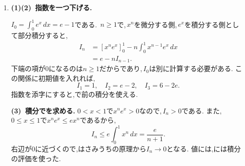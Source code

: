 \begin{enumerate}[label=\textbf{問\arabic*.},leftmargin=3.8em,format=\bookitemlink{practice-bridge}{solution}{problem}]
                \smallskip
                \textbf{(2)~重み付きの和と差.}
                $\sqrt3$の重みを付けた和と差の次項を作ると,
                \begin{align*}
                  z_{n+1}
                    &=(2x_n+3y_n)+\sqrt3(x_n+2y_n)\\
                    &=(2+\sqrt3)z_n.
                \end{align*}
                同様に$\displaystyle w_{n+1}=(2-\sqrt3)w_n$である.\,
                $\displaystyle z_0=w_0=1$から二つのを求め,
                \[
                  x_n=\frac{z_n+w_n}{2},\qquad
                  y_n=\frac{z_n-w_n}{2\sqrt3}
                \]
                と戻せばよい.重みは,展開後に元の$\displaystyle z_n,w_n$が現れるように選ばれている.

                \smallskip
                \textbf{(3)~無限個の整数解を作る.}
                初期値と係数から$x_n,y_n$は整数であり,$n\ge1$では両方が正となる.
                さらに,
                \[
                  x_{n+1}-x_n=x_n+3y_n>0
                \]
                なので,同じ解は繰り返されない.
                (1)のからすべて$\displaystyle x^2-3y^2=1$を満たすため,正の整数解が無限個得られる.
                に無理数が現れても,は整数性と異なる解の生成を保証する.
          \item \textbf{(1)(2)~指数を一つ下げる.}\par\nobreak
                $\displaystyle I_0=\int_0^1e^x\,dx=e-1$である.\,
                $\displaystyle n\ge1$で,\,$\displaystyle x^n$を微分する側,\,$\displaystyle e^x$を積分する側として部分積分すると,
                \begin{align*}
                  I_n&=[x^ne^x]_0^1
                       -n\int_0^1x^{n-1}e^x\,dx\\
                     &=e-nI_{n-1}.
                \end{align*}
                下端の項が$\displaystyle 0$になるのは$\displaystyle n\ge1$だからであり,\,$\displaystyle I_0$は別に計算する必要がある.
                この関係に初期値を入れれば,
                \[
                  I_1=1,\quad I_2=e-2,\quad I_3=6-2e.
                \]
                指数を添字にすると,で前の積分を使える.

                \smallskip
                \textbf{(3)~積分でを求める.}
                $\displaystyle 0<x<1$で$\displaystyle x^ne^x>0$なので,\,$\displaystyle I_n>0$である.
                また,\,$\displaystyle 0\le x\le1$で$\displaystyle x^ne^x\le ex^n$であるから,
                \[
                  I_n\le e\int_0^1x^n\,dx=\frac{e}{n+1}.
                \]
                右辺が$\displaystyle 0$に近づくので,はさみうちの原理から$\displaystyle I_n\to0$となる.
                値には,には積分の評価を使った.
        \end{enumerate}
